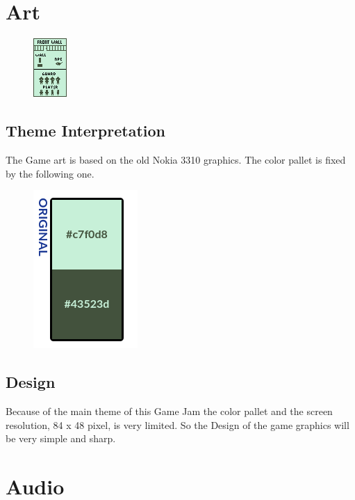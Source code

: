 \documentclass[12pt, a4paper]{article}
\begin{document}
{    \section{Art}
        
        \begin{figure}[h]
            \centering
            \includegraphics[scale=2]{./images/concept.png}
        \end{figure}

        \subsection{Theme Interpretation} %
            The Game art is based on the old Nokia 3310 graphics.
            The color pallet is fixed by the following one.
            \begin{figure}[h]
                \centering
                \includegraphics[scale=0.7, angle=90]{./images/colorpallet.png}
            \end{figure} 

        \subsection{Design}
            Because of the main theme of this Game Jam the color 
            pallet and the screen resolution, 84 x 48 pixel, is very limited.
            So the Design of the game graphics will be very simple and sharp.

    \section{Audio}

}
\end{document}
